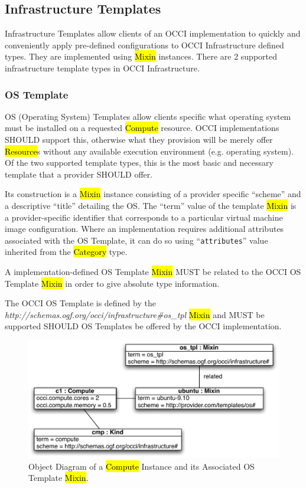\documentclass[10pt,a4paper]{article}
\begin{document}
\subsection{Infrastructure Templates}
Infrastructure Templates allow clients of an OCCI implementation to quickly and conveniently apply 
pre-defined configurations to OCCI Infrastructure defined types. They are implemented using
\hl{Mixin} instances. There are 2 supported infrastructure template types in OCCI Infrastructure.

\subsubsection{OS Template}
OS (Operating System) Templates allow clients specific what operating system must be installed on a
requested \hl{Compute} resource. OCCI implementations SHOULD support this, otherwise what they 
provision will be merely offer \hl{Resource}s without any available execution environment 
(e.g. operating system). Of the two supported template types, this is the most basic 
and necessary template that a provider SHOULD offer. 

Its construction is a \hl{Mixin} instance consisting of a provider specific ``scheme'' and a descriptive ``title'' 
detailing the OS. The ``term'' value of the template \hl{Mixin} is a provider-specific identifier that 
corresponds to a particular virtual machine image configuration. Where an implementation requires 
additional attributes associated with the OS Template, it can do so using ``{\tt attributes}'' value
inherited from the \hl{Category} type.

A implementation-defined OS Template \hl{Mixin} MUST be related to 
the OCCI OS Template \hl{Mixin} in order to give absolute type information. 

The OCCI OS Template 
is defined by the \textit{http://schemas.ogf.org/occi/infrastructure\#os\_tpl} \hl{Mixin} and
MUST be supported SHOULD OS Templates be offered by the OCCI implementation.

\begin{figure}[!h]
	\centering
	\includegraphics[scale=0.5]{figs/infra_template_obj_diag1}
	\caption{Object Diagram of a \hl{Compute} Instance and its Associated OS Template \hl{Mixin}.}
	\label{fig:infra_template_obj_diag1}
\end{figure}
\end{document}
